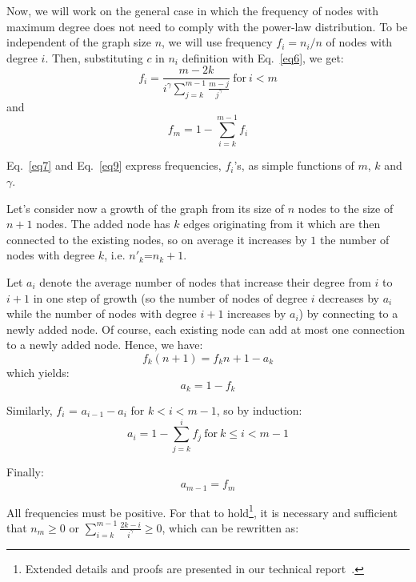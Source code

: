 \documentclass[10pt,journal,cspaper,compsoc]{IEEEtran}
\begin{document}
Now, we will work on the general case in which the frequency of nodes with maximum degree does not need to comply with the power-law distribution. To be independent of the graph size $n$, we will use frequency $f_i = n_i/n$ of nodes with degree $i$. Then, substituting $c$ in $n_i$ definition with Eq.~\ref{eq6}, we get:
\begin{equation}
\label{eq7}
f_i = \frac{m-2k}{i^{\gamma}\sum_{j=k}^{m-1}\frac{m-j}{j^{\gamma}}}~\mbox{for}~i<m
\end{equation}
and
\begin{equation}
\label{eq9}
f_m = 1- \sum_{i=k}^{m-1}f_i
\end{equation}

Eq.~\ref{eq7} and Eq.~\ref{eq9} express frequencies, $f_i$'s, as simple functions of $m$, $k$ and $\gamma$.

Let's consider now a growth of the graph from its size of $n$ nodes to the size of $n+1$ nodes. The added node has $k$ edges originating from it which are then connected to the existing nodes, so on average it increases by $1$ the number of nodes with degree $k$, i.e. $n'_k$=$n_k+1$.

Let $a_i$ denote the average number of nodes that increase their degree from $i$ to $i+1$ in one step of growth (so the number of nodes of degree $i$ decreases by $a_i$ while the number of nodes with degree $i+1$ increases by $a_i$) by connecting to a newly added node. Of course, each existing node can add at most one connection to a newly added node. Hence, we have:
\begin{equation}
f_k(n+1)=f_kn + 1 - a_k
\end{equation}
which yields:
\begin{equation}
\label{eq10}
a_k = 1- f_k
\end{equation}

Similarly,  $f_i$ = $a_{i-1} - a_i$ for $k<i<m-1$, so by induction:
\begin{equation}
\label{eq11}
a_i = 1- \sum_{j=k}^{i}f_j~\mbox{for}~k\leq i < m-1
\end{equation}

Finally:
\begin{equation}
\label{eq12}
a_{m-1} = f_m
\end{equation}

All frequencies must be positive. For that to hold\footnote{Extended details and proofs are presented in our technical report~\cite{RN-NEST-01-2011}.}, it is necessary and sufficient that $n_m$$\geq 0$ or $\sum_{i=k}^{m-1}\frac{2k-i}{i^{\gamma}}\geq 0$, which can be rewritten as:
\end{document}
